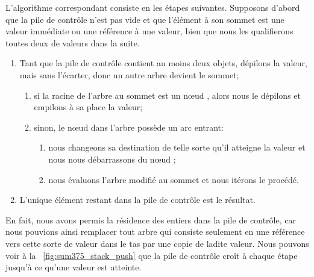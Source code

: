 L'algorithme correspondant consiste en les étapes suivantes. Supposons
d'abord que la pile de contrôle n'est pas vide et que l'élément à son
sommet est une valeur immédiate ou une référence à une valeur, bien
que nous les qualifierons toutes deux de valeurs dans la suite.
\begin{enumerate}

  \item Tant que la pile de contrôle contient au moins deux objets,
    dépilons la valeur, mais sans l'écarter, donc un autre arbre
    devient le sommet;
    \begin{enumerate}

    \item si la racine de l'arbre au sommet est un n{\oe}ud ,
      alors nous le dépilons et empilons à sa place la valeur;

    \item sinon, le n{\oe}ud  dans l'arbre possède un arc
      entrant:
      \begin{enumerate}

      \item nous changeons sa destination de telle sorte qu'il
        atteigne la valeur et nous nous débarrassons du n{\oe}ud
        ;

      \item nous évaluons l'arbre modifié au sommet et nous itérons le
        procédé.

      \end{enumerate}

    \end{enumerate}

  \item L'unique élément restant dans la pile de contrôle est le résultat.

\end{enumerate}
En fait, nous avons permis la résidence des entiers dans la pile de
contrôle, car nous pouvions ainsi remplacer tout arbre qui consiste
seulement en une référence vers cette sorte de valeur dans le tas par
une copie de ladite valeur. Nous pouvons voir à la
\fig~\ref{fig:sum375_stack_push} que la pile de contrôle croît à
chaque étape jusqu'à ce qu'une valeur est atteinte.
 


